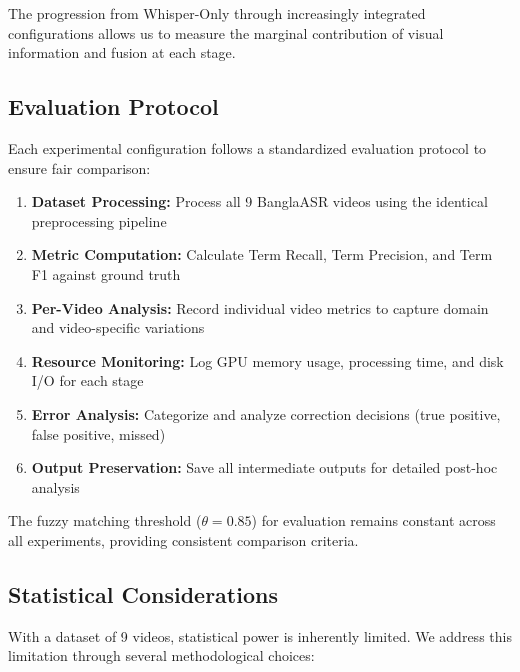 The progression from Whisper-Only through increasingly integrated configurations allows us to measure the marginal contribution of visual information and fusion at each stage.

\subsection{Evaluation Protocol}

Each experimental configuration follows a standardized evaluation protocol to ensure fair comparison:

\begin{enumerate}
    \item \textbf{Dataset Processing:} Process all 9 BanglaASR videos using the identical preprocessing pipeline
    \item \textbf{Metric Computation:} Calculate Term Recall, Term Precision, and Term F1 against ground truth
    \item \textbf{Per-Video Analysis:} Record individual video metrics to capture domain and video-specific variations
    \item \textbf{Resource Monitoring:} Log GPU memory usage, processing time, and disk I/O for each stage
    \item \textbf{Error Analysis:} Categorize and analyze correction decisions (true positive, false positive, missed)
    \item \textbf{Output Preservation:} Save all intermediate outputs for detailed post-hoc analysis
\end{enumerate}

The fuzzy matching threshold ($\theta = 0.85$) for evaluation remains constant across all experiments, providing consistent comparison criteria.

\subsection{Statistical Considerations}

With a dataset of 9 videos, statistical power is inherently limited. We address this limitation through several methodological choices:

